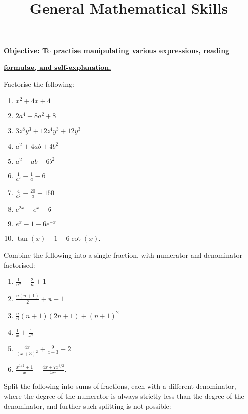 \documentclass{article}
\begin{document}
\title{General Mathematical Skills}
\date{}

\maketitle
\thispagestyle{empty}

\Large

\textbf{\underline{Objective: To practise manipulating various expressions, reading}}

\textbf{\underline{formulae, and self-explanation.}}







\vspace{5mm}



Factorise the following:

\begin{enumerate}
	\item $x^2+4x+4$
	\item $2a^4+8a^2+8$
	\item $3z^8y^3+12z^4y^3+12y^3$
	\item $a^2+4ab + 4b^2$
	\item $a^2-ab-6b^2$
	\item $\frac{1}{a^2}-\frac{1}{a}-6$
	\item $\frac{4}{a^2}-\frac{20}{a}-150$
	\item $e^{2x}-e^x - 6$
	\item $e^x - 1 - 6e^{-x}$
	\item $\tan(x) - 1 - 6\cot(x)$.
\end{enumerate}
\bigskip


Combine the following into a single fraction, with numerator and denominator factorised:

\begin{enumerate}
	\item $\frac{1}{n^2}-\frac{2}{n}+1$
	\item $\frac{n(n+1)}{2}+n+1$
	\item $\frac{n}{6}(n+1)(2n+1)+(n+1)^2$
	\item $\frac{1}{x}+\frac{1}{x^2}$
	\item $\frac{4x}{(x+3)^2}+\frac{9}{x+3}-2$
	\item $\frac{x^{1/2}+1}{x}-\frac{4x+7x^{3/2}}{4x^2}$.
\end{enumerate}

\clearpage


Split the following into sums of fractions, each with a different denominator, where the degree of the numerator is always strictly less than the degree of the denominator, and further such splitting is not possible:
\end{document}
